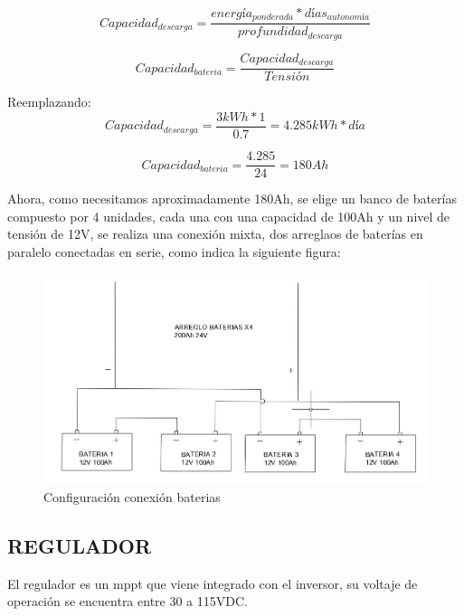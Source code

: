 \documentclass[journal]{IEEEtran}
\begin{document}
\begin{equation}
    Capacidad_{descarga}= \dfrac{energía_{ponderada} *días_{ autonomía}}{profundidad_{descarga}}
\end{equation}

\begin{equation}
Capacidad_{bateria}= \dfrac{Capacidad_{descarga}}{Tensión}
\end{equation}

Reemplazando:
\begin{equation}
    Capacidad_{descarga}= \dfrac{3kWh*1}{0.7}= 4.285kWh*día
\end{equation}

\begin{equation}
Capacidad_{bateria}= \dfrac{4.285}{24} = 180Ah
\end{equation}

Ahora, como necesitamos aproximadamente 180Ah, se elige un banco de baterías compuesto por 4 unidades, cada una con una capacidad de 100Ah y un nivel de tensión de 12V, se realiza una conexión mixta, dos arreglaos de baterías en paralelo conectadas en serie, como indica la siguiente figura: \\

\begin{figure}[H]
    \centering
    \includegraphics[scale=0.4]{Array_bat.JPG}
    \caption{Configuración conexión baterias}
    \label{curva}
\end{figure}





\subsection*{REGULADOR}
El regulador es un mppt que viene integrado con el inversor, su voltaje de operación se encuentra entre 30 a 115VDC.
\end{document}
